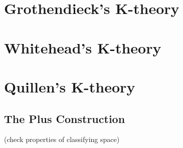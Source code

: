 








\chapter{Grothendieck's K-theory}





\chapter{Whitehead's K-theory}

\chapter{Quillen's K-theory}

\section{The Plus Construction}
(check properties of classifying space)

